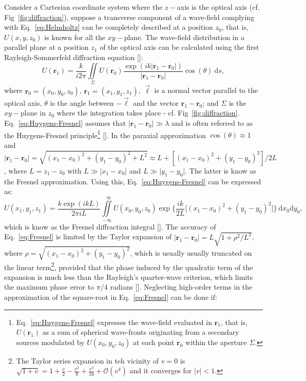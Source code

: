 \begin{refsection}
Consider a Cartesian coordinate system where the $z-$axis is the optical axis (cf. Fig~\ref{fig:diffraction}), suppose a transverse component of a wave-field complying with Eq.~\ref{eq:Helmholtz} can be completely described at a position $z_0$, that is, $U(x,y,z_0)$ is known for all the $xy-$plane. The wave-field distribution in a parallel plane at a position $z_1$ of the optical axis can be calculated using the first Rayleigh-Sommerfeld diffraction equation [\cite[\textit{Eq.~3-42}]{Goodman2017}]:
\begin{equation}\label{eq:Huygens-Fresnel}
    U(\textbf{r}_1) = \frac{k}{i2\pi}\iint\limits_{\Sigma}{U(\textbf{r}_0)\frac{\exp{(ik\vert\textbf{r}_1 - \textbf{r}_0\vert)}}{\vert\textbf{r}_1 - \textbf{r}_0\vert}\cos{(\theta)}~\mathrm{d}s},
\end{equation}
where $\textbf{r}_0=(x_0,y_0,z_0)$, $\textbf{r}_1=(x_1,y_1,z_1)$, $\vec{\ell}$ is a normal vector parallel to the optical axis, $\theta$ is the angle between $-\vec{\ell}$ and the vector $\textbf{r}_1-\textbf{r}_0$; and $\Sigma$ is the $xy-$plane in $z_0$ where the integration takes place - cf. Fig~\ref{fig:diffraction}. Eq.~\ref{eq:Huygens-Fresnel} assumes that $\vert\textbf{r}_1 - \textbf{r}_0\vert\gg\lambda$ and is often referred to as the Huygens-Fresnel principle\footnote{Eq.~\ref{eq:Huygens-Fresnel} expresses the wave-field evaluated in $\textbf{r}_1$, that is, $U(\textbf{r}_1)$ as a sum of spherical wave-fronts originating from a secondary sources modulated by $U(x_0,y_0,z_0)$ at each point $\textbf{r}_0$ within the aperture $\Sigma$.} [\cite[\textit{§3.7}]{Goodman2017}]. In the paraxial approximation $\cos{(\theta)}\approx1$ and $\vert\textbf{r}_1 - \textbf{r}_0\vert=\sqrt{(x_1-x_0)^2+(y_1-y_0)^2+L^2}\approx L +[(x_1-x_0)^2+(y_1-y_0)^2]/2L$, where $L=z_1-z_0$ with $L\gg\vert x_1-x_0\vert$ and $L\gg\vert y_1-y_0\vert$. The latter is know as the Fresnel approximation. Using this, Eq.~\ref{eq:Huygens-Fresnel} can be expressed as:
\begin{equation}\label{eq:Fresnel}
    U(x_1,y_1,z_1)=\frac{k\exp{(ikL)}}{2\pi i L}\iint\limits_{-\infty}^{\hspace{8pt}\infty}{U(x_0,y_0,z_0)\exp{\Bigg\{\frac{ik}{2L}\big[(x_1-x_0)^2+(y_1-y_0)^2 \big]\Bigg\}}~\mathrm{d}x_0\mathrm{d}y_0},
\end{equation}
which is know as the Fresnel diffraction integral [\cite[\textit{§4.2}]{Goodman2017}]. The accuracy of Eq.~\ref{eq:Fresnel} is limited by the Taylor expansion of $\vert\textbf{r}_1 - \textbf{r}_0\vert=L\sqrt{1+\rho^2/L^2}$, where  $\rho = \sqrt{(x_1-x_0)^2+(y_1-y_0)^2}$, which is usually usually truncated on the linear term\footnote{The Taylor series expansion in teh vicinity of $v=0$ is $\sqrt{1+v}=1+\frac{v}{2}-\frac{v^2}{8}+\frac{v^3}{16}+\mathcal{O}(v^4)$ and it converges for $\vert v\vert<1$.}, provided that the phase induced by the quadratic term of the expansion is much less than the Rayleigh's quarter-wave criterion, which limits the maximum phase error to $\pi/4$ radians [\cite[\textit{§9.3}]{born_wolf1999}]. Neglecting high-order terms in the approximation of the square-root in Eq.~\ref{eq:Fresnel} can be done if:

\end{refsection}
